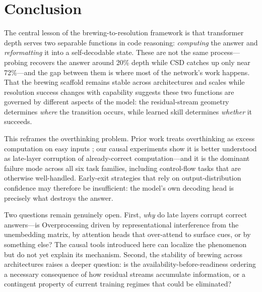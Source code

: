 
\section{Conclusion}
\label{sec:conclusion}

The central lesson of the brewing-to-resolution framework is that transformer depth serves two separable functions in code reasoning: \emph{computing} the answer and \emph{reformatting} it into a self-decodable state. These are not the same process---probing recovers the answer around 20\% depth while CSD catches up only near 72\%---and the gap between them is where most of the network's work happens. That the brewing scaffold remains stable across architectures and scales while resolution success changes with capability suggests these two functions are governed by different aspects of the model: the residual-stream geometry determines \emph{where} the transition occurs, while learned skill determines \emph{whether} it succeeds.

This reframes the overthinking problem. Prior work treats overthinking as excess computation on easy inputs \citep{halawi2024overthinking}; our causal experiments show it is better understood as late-layer corruption of already-correct computation---and it is the dominant failure mode across all six task families, including control-flow tasks that are otherwise well-handled. Early-exit strategies that rely on output-distribution confidence may therefore be insufficient: the model's own decoding head is precisely what destroys the answer.

Two questions remain genuinely open. First, \emph{why} do late layers corrupt correct answers---is Overprocessing driven by representational interference from the unembedding matrix, by attention heads that over-attend to surface cues, or by something else? The causal tools introduced here can localize the phenomenon but do not yet explain its mechanism. Second, the stability of brewing across architectures raises a deeper question: is the availability-before-readiness ordering a necessary consequence of how residual streams accumulate information, or a contingent property of current training regimes that could be eliminated?
